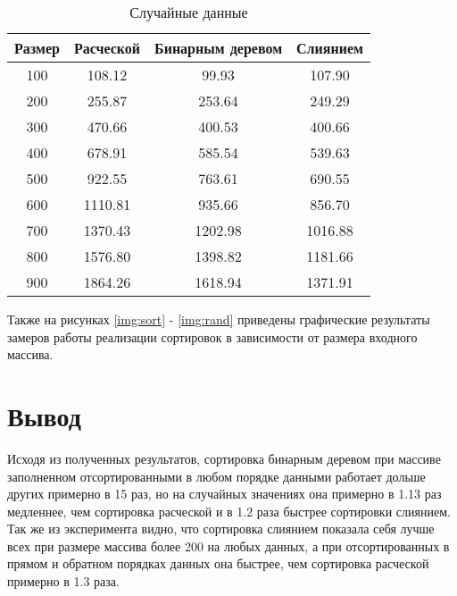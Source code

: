 \begin{table}[h]
	\begin{center}
		\begin{threeparttable}
		\captionsetup{singlelinecheck=off}
		\caption{Случайные данные}
		\label{tbl:random}
		\begin{tabular}{|c|c|c|c|}
			\hline
			 Размер & Расческой & Бинарным деревом & Слиянием \\
			\hline
			  100 & 108.12 & 99.93 & 107.90 \\ 
			\hline
			200 & 255.87 & 253.64 & 249.29 \\ 
			\hline
			300 & 470.66 & 400.53 & 400.66 \\ 
			\hline
			400 & 678.91 & 585.54 & 539.63 \\ 
			\hline
			500 & 922.55 & 763.61 & 690.55 \\ 
			\hline
			600 & 1110.81 & 935.66 & 856.70 \\ 
			\hline
			700 & 1370.43 & 1202.98 & 1016.88 \\ 
			\hline
			800 & 1576.80 & 1398.82 & 1181.66 \\ 
			\hline
			900 & 1864.26 & 1618.94 & 1371.91 \\ 
			\hline
		\end{tabular}
		\end{threeparttable}
    \end{center}
\end{table}

Также на рисунках \ref{img:sort} - \ref{img:rand} приведены графические результаты замеров работы реализации сортировок в зависимости от размера входного массива.


\clearpage

\section*{Вывод}
Исходя из полученных результатов, сортировка бинарным деревом при массиве заполненном отсортированными в любом порядке данными работает дольше других примерно в 15 раз, но на случайных значениях она примерно в 1.13 раз медленнее, чем сортировка расческой и в 1.2 раза быстрее сортировки слиянием.
Так же из эксперимента видно, что сортировка слиянием показала себя лучше всех при размере массива более 200 на любых данных, а при отсортированных в прямом и обратном порядках данных она быстрее, чем сортировка расческой примерно в 1.3 раза.
